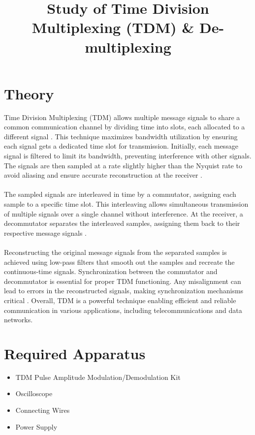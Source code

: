 \documentclass[12pt]{article}
\title{Study of Time Division Multiplexing (TDM) \& De-multiplexing}
\author{}
\date{}
\begin{document}


\pagebreak

\tableofcontents

\pagebreak
{}
\maketitle

\section*{Theory}
Time Division Multiplexing (TDM) allows multiple message signals to share a common communication channel by dividing time into slots, each allocated to a different signal \cite{proakis_digital_communications}. This technique maximizes bandwidth utilization by ensuring each signal gets a dedicated time slot for transmission. Initially, each message signal is filtered to limit its bandwidth, preventing interference with other signals. The signals are then sampled at a rate slightly higher than the Nyquist rate to avoid aliasing and ensure accurate reconstruction at the receiver \cite{oppenheim_signals_systems}.
\\\\
The sampled signals are interleaved in time by a commutator, assigning each sample to a specific time slot. This interleaving allows simultaneous transmission of multiple signals over a single channel without interference. At the receiver, a decommutator separates the interleaved samples, assigning them back to their respective message signals \cite{haykin_communication_systems}.
\\\\
Reconstructing the original message signals from the separated samples is achieved using low-pass filters that smooth out the samples and recreate the continuous-time signals. Synchronization between the commutator and decommutator is essential for proper TDM functioning. Any misalignment can lead to errors in the reconstructed signals, making synchronization mechanisms critical \cite{sklar_digital_communications}. Overall, TDM is a powerful technique enabling efficient and reliable communication in various applications, including telecommunications and data networks.


\section*{Required Apparatus}
\begin{itemize}
    \item TDM Pulse Amplitude Modulation/Demodulation Kit
    \item Oscilloscope
    \item Connecting Wires
    \item Power Supply
\end{itemize}
\end{document}
